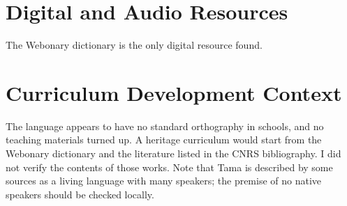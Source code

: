\documentclass[12pt]{article}
\begin{document}
\section{Digital and Audio Resources}
The Webonary dictionary is the only digital resource found.

\section{Curriculum Development Context}
The language appears to have no standard orthography in schools, and no teaching materials turned up. A heritage curriculum would start from the Webonary dictionary and the literature listed in the CNRS bibliography. I did not verify the contents of those works. Note that Tama is described by some sources as a living language with many speakers; the premise of no native speakers should be checked locally.
\end{document}

